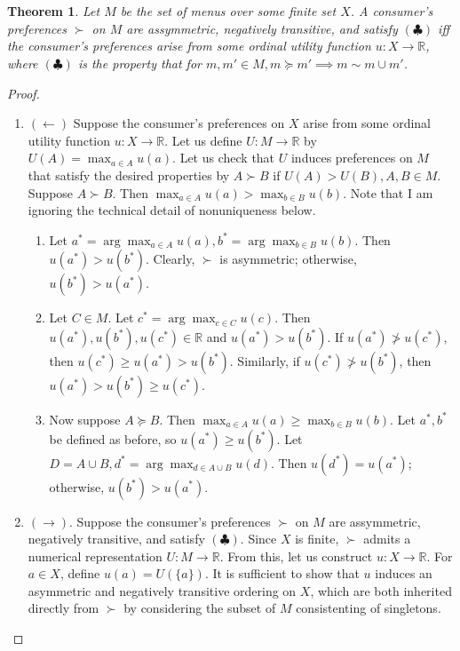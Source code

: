 \documentclass[12pt]{article}
\newtheorem{thm}{Theorem}[section]
\theoremstyle{definition}
\theoremstyle{remark}
\def\RR{\mathbb{R}}
\begin{document}
\section{}
\begin{thm}
  Let $M$ be the set of menus over some finite set $X$. A consumer's preferences $\succ$ on $M$ are assymmetric, negatively transitive, and satisfy $(\clubsuit)$ iff the consumer's preferences arise from some ordinal utility function $u:X \rightarrow \RR$, where $(\clubsuit)$ is the property that for $m, m' \in M, m \succeq m' \implies m \sim m \cup m'$.
\end{thm}
\begin{proof}
\begin{enumerate}
  \item $(\leftarrow)$ Suppose the consumer's preferences on $X$ arise from some ordinal utility function $u:X \rightarrow \RR$. Let us define $U:M \rightarrow \RR$ by $U(A) = \max_{a \in A} u(a)$. Let us check that $U$ induces preferences on $M$ that satisfy the desired properties by $A \succ B$ if $U(A) > U(B), A, B \in M$. Suppose $A \succ B$. Then $\max_{a \in A} u(a) > \max_{b \in B} u(b)$. Note that I am ignoring the technical detail of nonuniqueness below.
  \begin{enumerate}
    \item Let $a^* = \arg \max_{a \in A}u(a), b^* = \arg \max_{b \in B}u(b)$. Then $u(a^*) > u(b^*)$. Clearly, $\succ$ is asymmetric; otherwise, $u(b^*) > u(a^*)$.
    \item Let $C \in M$. Let $c^* = \arg \max_{c \in C}u(c)$. Then $u(a^*), u(b^*), u(c^*) \in \RR$ and $u(a^*) > u(b^*)$. If $u(a^*) \not> u(c^*)$, then $u(c^*) \geq u(a^*) > u(b^*)$. Similarly, if $u(c^*) \not> u(b^*)$, then $u(a^*) > u(b^*) \geq u(c^*)$.
    \item Now suppose $A \succeq B$. Then $\max_{a \in A} u(a) \geq \max_{b \in B} u(b)$. Let $a^*, b^*$ be defined as before, so $u(a^*) \geq u(b^*)$. Let $D = A \cup B, d^* = \arg \max_{d \in A \cup B}u(d)$. Then $u(d^*) = u(a^*)$; otherwise, $u(b^*) > u(a^*)$.
  \end{enumerate}
  \item $(\rightarrow)$. Suppose the consumer's preferences $\succ$ on $M$ are assymmetric, negatively transitive, and satisfy $(\clubsuit)$. Since $X$ is finite, $\succ$ admits a numerical representation $U:M \rightarrow \RR$. From this, let us construct $u: X \rightarrow \RR$. For $a \in X$, define $u(a) = U(\{ a \})$. It is sufficient to show that $u$ induces an asymmetric and negatively transitive ordering on $X$, which are both inherited directly from $\succ$ by considering the subset of $M$ consistenting of singletons. 
\end{enumerate}
\end{proof}
%
%
\end{document}
